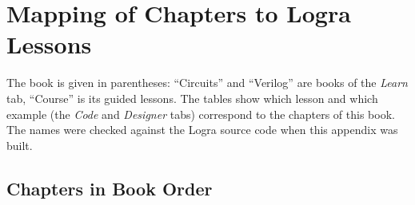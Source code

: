\chapter{Mapping of Chapters to Logra Lessons}
\label{app:logramap}

The book is given in parentheses: ``Circuits'' and ``Verilog'' are books of the \emph{Learn} tab, ``Course'' is its guided lessons. The tables show which lesson
and which example (the \emph{Code} and \emph{Designer} tabs) correspond to the chapters of this book. The names were checked against the Logra
source code when this appendix was built.

\section*{Chapters in Book Order}
